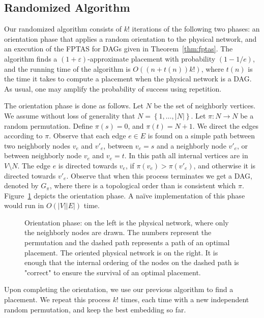 \documentclass[11pt]{article}
\newcommand{\set}[1]{\left\{ #1 \right\}}
\newcommand{\abs}[1]{\left| #1 \right|}
\newcommand{\eps}{\varepsilon}
\begin{document}

\subsection{Randomized Algorithm}

Our randomized algorithm consists of $k!$ iterations of the following
two phases: an orientation phase that applies a random orientation to
the physical network, and an execution of the FPTAS for DAGs given in
Theorem~\ref{thm:fptas}.  The algorithm finds a $(1+\eps)$-approximate
placement with probability $(1-1/e)$, and the running time of the
algorithm is $O((n+t(n))k!)$, where $t(n)$ is the time it takes to
compute a placement when the physical network is a DAG.
%
As usual, one may amplify the probability of success using repetition.

The orientation phase is done as follows.  Let $N$ be the set of
neighborly vertices.  We assume without loss of generality that $N =
\set{1,\ldots,\abs{N}}$.
%
Let $\pi:N \to N$ be a random permutation.  Define $\pi(s) = 0$, and
$\pi(t) = N+1$.  We direct the edges according to $\pi$.
%
Observe that each edge $e \in E$ is found on a simple path between two
neighborly nodes $v_e$ and $v'_e$, between $v_e = s$ and a neighborly
node $v'_e$, or between neighborly node $v_e$ and $v_e = t$.  In this
path all internal vertices are in $V \setminus N$.  The edge $e$ is
directed towards $v_e$, if $\pi(v_e) > \pi(v'_e)$, and otherwise it is
directed towards $v'_e$.
%
Observe that when this process terminates we get a DAG, denoted by
$G_\pi$, where there is a topological order than is consistent which
$\pi$.  Figure~\ref{fig:orientation} depicts the orientation phase.
%
A na\"ive implementation of this phase would run in $O(|V||E|)$ time.

\begin{figure}[t]
\centering
\scalebox{0.9}{
  
}
\caption{Orientation phase: on the left is the physical network, where
  only the neighborly nodes are drawn.  The numbers represent the
  permutation and the dashed path represents a path of an optimal
  placement.  The oriented physical network is on the right.  It is
  enough that the internal ordering of the nodes on the dashed path is
  "correct" to ensure the survival of an optimal placement. }
\label{fig:orientation}
\end{figure}

Upon completing the orientation, we use our previous algorithm to find
a placement.  We repeat this process $k!$ times, each time with a new
independent random permutation, and keep the best embedding so far.
\end{document}

